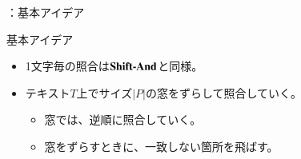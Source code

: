 \documentclass[dvipdfmx,12pt,beamer]{standalone}
\begin{document}
\begin{frame}{\BNDM：基本アイデア}
	\begin{block}{基本アイデア}	
		\begin{itemize}
			\item 1文字毎の照合は$\textbf{Shift-And}$と同様。
			\item テキスト$T$上でサイズ$|P|$の窓をずらして照合していく。
				\begin{itemize}
					\item	窓では、逆順に照合していく。
					\item 窓をずらすときに、一致しない箇所を飛ばす。
				\end{itemize}
		\end{itemize}
	\end{block}
\end{frame}
\end{document}
